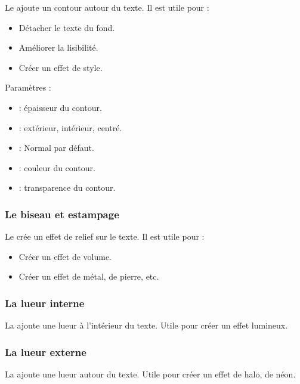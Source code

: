Le  ajoute un contour autour du texte. Il est utile pour :

\begin{itemize}
    \item Détacher le texte du fond.
    \item Améliorer la lisibilité.
    \item Créer un effet de style.
\end{itemize}

Paramètres :

\begin{itemize}
    \item {} : épaisseur du contour.
    \item {} : extérieur, intérieur, centré.
    \item {} : Normal par défaut.
    \item {} : couleur du contour.
    \item {} : transparence du contour.
\end{itemize}

\subsubsection{Le biseau et estampage}

Le  crée un effet de relief sur le texte. Il est utile pour :

\begin{itemize}
    \item Créer un effet de volume.
    \item Créer un effet de métal, de pierre, etc.
\end{itemize}

\subsubsection{La lueur interne}

La  ajoute une lueur à l'intérieur du texte. Utile pour créer un effet lumineux.

\subsubsection{La lueur externe}

La  ajoute une lueur autour du texte. Utile pour créer un effet de halo, de néon.

